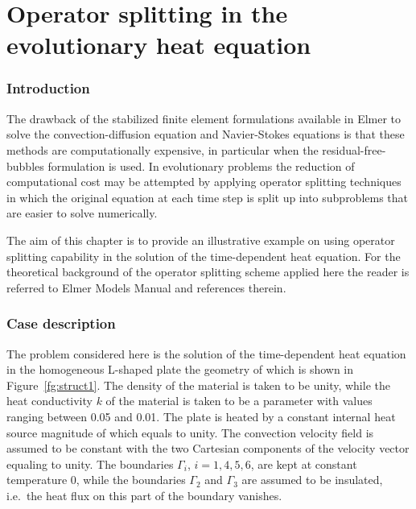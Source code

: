 \chapter{Operator splitting in the evolutionary heat equation}



\subsection*{Introduction}

The drawback of the stabilized finite element formulations available
in Elmer to solve the convection-diffusion equation and Navier-Stokes
equations is that these methods are computationally expensive, in particular
when the residual-free-bubbles formulation is used.
In evolutionary problems the reduction of computational cost may be attempted
by applying operator splitting techniques in which the original equation at
each time step is split up into subproblems that are
easier to solve numerically.

The aim of this chapter is to provide an illustrative example on
using operator splitting capability in the solution of the 
time-dependent heat equation. 
For the theoretical background of the operator splitting scheme applied here
the reader is referred to Elmer Models Manual and references therein.



\subsection*{Case description}

The problem considered here is the solution of the time-dependent 
heat equation in the homogeneous L-shaped plate the geometry of which is shown 
in Figure~\ref{fg:struct1}. 
The density of the material is taken to be unity, while the heat 
conductivity $k$ of the material is taken to be a 
parameter with values ranging between 0.05 and 0.01. The plate is
heated by a constant internal heat source magnitude of which equals to unity. 
The convection velocity field is assumed to be constant with the two 
Cartesian components of the velocity vector equaling to unity. 
The boundaries $\Gamma_i$,
$i=1,4,5,6$, are kept at constant temperature $0$, while the boundaries
$\Gamma_2$ and $\Gamma_3$ are assumed to be insulated, i.e.\ the heat flux
on this part of the boundary vanishes. 

